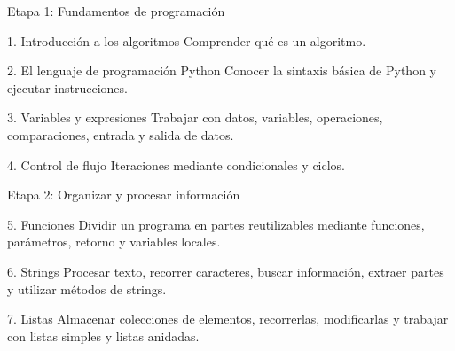 \documentclass{beamer}
\begin{document}
    \begin{frame}[label=contenidos]{Etapa 1: Fundamentos de programación}

        \begin{block}{1. Introducción a los algoritmos}
        Comprender qué es un algoritmo.
        \end{block}
        
        \begin{block}{2. El lenguaje de programación Python}
        Conocer la sintaxis básica de Python y ejecutar instrucciones.
        \end{block}
        
        \begin{block}{3. Variables y expresiones}
        Trabajar con datos, variables, operaciones, comparaciones, entrada y salida de datos.
        \end{block}

        \begin{block}{4. Control de flujo}
            Iteraciones mediante condicionales y ciclos.
        \end{block}
        
    \end{frame}

        
        

    \begin{frame}{Etapa 2: Organizar y procesar información}

        \begin{block}{5. Funciones}
        Dividir un programa en partes reutilizables mediante funciones,
        parámetros, retorno y variables locales.
        \end{block}
        
        \begin{block}{6. Strings}
        Procesar texto, recorrer caracteres, buscar información,
        extraer partes y utilizar métodos de strings.
        \end{block}
        
        \begin{block}{7. Listas}
        Almacenar colecciones de elementos, recorrerlas, modificarlas
        y trabajar con listas simples y listas anidadas.
        \end{block}
        
    \end{frame}
\end{document}
